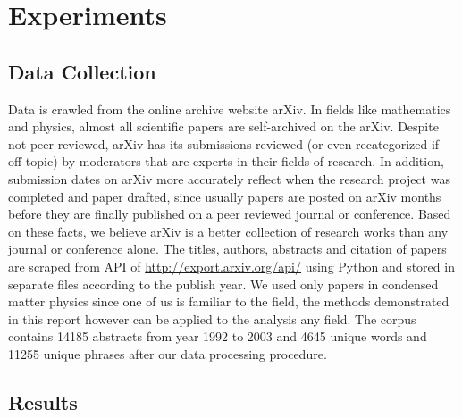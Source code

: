 \documentclass[DIV=calc, paper=letter, fontsize=10pt, twocolumn]{scrartcl}	 %
\begin{document}
\section*{Experiments}

\subsection*{Data Collection}
Data is crawled from the online archive website arXiv. In fields like mathematics and physics, almost all scientific papers are self-archived on the arXiv. Despite not peer reviewed, arXiv has its submissions reviewed (or even recategorized if off-topic) by moderators that are experts in their fields of research. In addition, submission dates on arXiv more accurately reflect when the research project was completed and paper drafted, since usually papers are posted on arXiv months before they are finally published on a peer reviewed journal or conference. Based on these facts, we believe arXiv is a better collection of research works than any journal or conference alone.\newline
The titles, authors, abstracts and citation of papers are scraped from API of \url{http://export.arxiv.org/api/} using Python and stored in separate files according to the publish year. We used only papers in condensed matter physics since one of us is familiar to the field, the methods demonstrated in this report however can be applied to the analysis any field. The corpus contains 14185 abstracts from year 1992 to 2003 and 4645 unique words and 11255 unique phrases after our data processing procedure.


\subsection*{Results}
\end{document}
